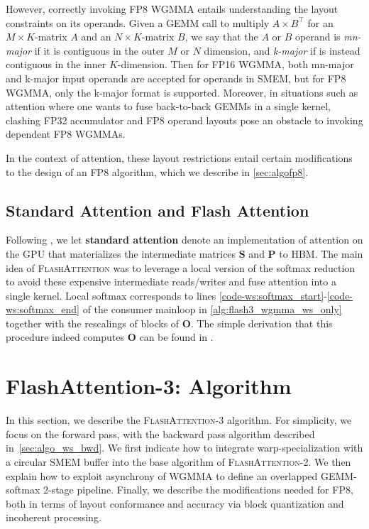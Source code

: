 However, correctly invoking FP8 WGMMA entails understanding the layout constraints on its operands. Given a GEMM call to multiply $A \times B^{\top}$ for an $M\times K$-matrix $A$ and an $N\times K$-matrix $B$, we say that the $A$ or $B$ operand is \emph{mn-major} if it is contiguous in the outer $M$ or $N$ dimension, and \emph{k-major} if is instead contiguous in the inner $K$-dimension. Then for FP16 WGMMA, both mn-major and k-major input operands are accepted for operands in SMEM, but for FP8 WGMMA, only the k-major format is supported. Moreover, in situations such as attention where one wants to fuse back-to-back GEMMs in a single kernel, clashing FP32 accumulator and FP8 operand layouts pose an obstacle to invoking dependent FP8 WGMMAs.

In the context of attention, these layout restrictions entail certain modifications to the design of an FP8 algorithm, which we describe in \cref{sec:algofp8}.

\subsection{Standard Attention and Flash Attention} Following \citet{dao2022flashattention}, we let \textbf{standard attention} denote an implementation of attention on the GPU that materializes the intermediate matrices $\mathbf{S}$ and $\mathbf{P}$ to HBM. The main idea of \textsc{FlashAttention} was to leverage a local version of the softmax reduction to avoid these expensive intermediate reads/writes and fuse attention into a single kernel. Local softmax corresponds to lines \ref{code-ws:softmax_start}-\ref{code-ws:softmax_end} of the consumer mainloop in \cref{alg:flash3_wgmma_ws_only} together with the rescalings of blocks of $\mathbf{O}$. The simple derivation that this procedure indeed computes $\mathbf{O}$ can be found in \cite[\S 2.3.1]{dao2023flashattention2}.

\section{FlashAttention-3: Algorithm}
\label{sec:algo}

In this section, we describe the \textsc{FlashAttention-3} algorithm. For simplicity, we focus on the forward pass, with the backward pass algorithm described in~\cref{sec:algo_ws_bwd}. We first indicate how to integrate warp-specialization with a circular SMEM buffer into the base algorithm of \textsc{FlashAttention-2}. We then explain how to exploit asynchrony of WGMMA to define an overlapped GEMM-softmax 2-stage pipeline. Finally, we describe the modifications needed for FP8, both in terms of layout conformance and accuracy via block quantization and incoherent processing.

